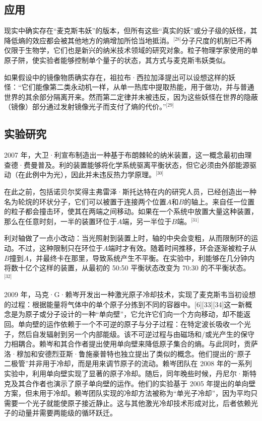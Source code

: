 \subsection{应用}
现实中确实存在“麦克斯韦妖”的版本，但所有这些“真实的妖”或分子级的妖怪，其降低熵的效应都会被其他地方的熵增加所恰当地抵消。\(^\text{[28]}\)分子尺度的机制已不再仅限于生物学，它们也是新兴的纳米技术领域的研究对象。粒子物理学家使用的单原子阱，使实验者能够控制单个量子的状态，其方式与麦克斯韦妖类似。

如果假设中的镜像物质确实存在，祖拉布·西拉加泽提出可以设想这样的妖怪：“它们能像第二类永动机一样，从单一热库中提取热能，用于做功，并与普通世界的其余部分隔离开来。然而第二定律并未被违反，因为这些妖怪在世界的隐蔽（镜像）部分通过发射镜像光子而支付了熵的代价。”\(^\text{[29]}\)
\subsection{实验研究}
2007 年，大卫·利宣布制造出一种基于布朗棘轮的纳米装置，这一概念最初由理查德·费曼普及。利的装置能够将化学系统驱离平衡状态，但它必须由外部能源驱动（在此例中为光），因此并未违反热力学原理。\(^\text{[30]}\)

在此之前，包括诺贝尔奖得主弗雷泽·斯托达特在内的研究人员，已经创造出一种名为轮烷的环状分子，它们可以被置于连接两个位置$A$和$B$的轴上。来自任一位置的粒子都会撞击环，使其在两端之间移动。如果在一个系统中放置大量这种装置，那么在任意时刻，一半的装置环位于$A$端，另一半位于$B$端。\(^\text{[31]}\)

利对轴做了一点小改动：当光照射到装置上时，轴的中央会变粗，从而限制环的运动。不过，这种限制只在环位于$A$端时才有效。随着时间推移，环会逐渐被粒子从 $B$撞到$A$，并最终卡在那里，导致系统产生不平衡。在实验中，利能够在几分钟内将数十亿个这样的装置，从最初的 50:50 平衡状态改变为 70:30 的不平衡状态。\(^\text{[32]}\)

2009 年，马克·G·赖岑开发出一种激光原子冷却技术，实现了麦克斯韦当初设想的过程：根据能量将气体中的单个原子分拣到不同的容器中。[6][33][34]这一新概念是为原子或分子设计的一种“单向壁”，它允许它们向一个方向移动，却不能返回。单向壁的运作依赖于一个不可逆的原子与分子过程：在特定波长吸收一个光子，然后自发辐射到另一个内部能级。该不可逆过程与由磁场和/或光产生的保守力相耦合。赖岑和其合作者提出使用单向壁来降低原子集合的熵。与此同时，贡萨洛·穆加和安德烈亚斯·鲁施豪普特也独立提出了类似的概念。他们提出的“原子二极管”并非用于冷却，而是用来调节原子的流动。赖岑团队在 2008 年的一系列实验中，利用单向壁实现了显著的原子冷却。随后，同年晚些时候，丹尼尔·斯特克及其合作者也演示了原子单向壁的运作。他们的实验基于 2005 年提出的单向壁方案，但未用于冷却。赖岑团队实现的冷却方法被称为“单光子冷却”，因为平均只需要一个光子就能使原子接近静止。这与其他激光冷却技术形成对比，后者依赖光子的动量并需要两能级的循环跃迁。

